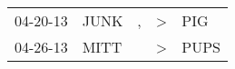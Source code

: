 \begin{supertabular}{p{0.07\textwidth}p{0.06\textwidth}p{0.02\textwidth}p{0.02\textwidth}p{0.06\textwidth}}
 04-20-13\textsuperscript{} &  JUNK\textsuperscript{} &  , &  \textgreater &   PIG\textsuperscript{} \\
 04-26-13\textsuperscript{} &  MITT\textsuperscript{} &    &  \textgreater &  PUPS\textsuperscript{} \\
\end{supertabular}
